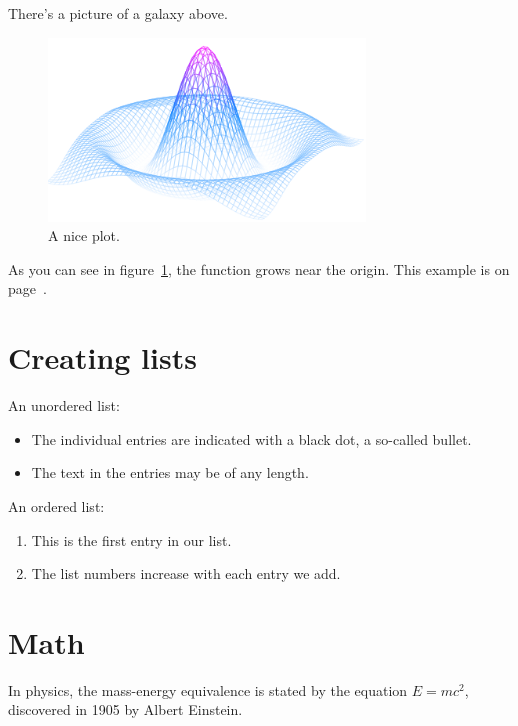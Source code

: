 \documentclass[12pt, letterpaper]{article}
\begin{document}
    There's a picture of a galaxy above.

    \begin{figure}[h]
        \centering
        \includegraphics[width=0.75\textwidth]{mesh}
        \caption{A nice plot.}
        \label{fig:mesh1}
    \end{figure}

    As you can see in figure~\ref{fig:mesh1}, the function grows near the origin.
    This example is on page~\pageref{fig:mesh1}.


    \section{Creating lists}\label{sec:creating-lists}

    An unordered list:

    \begin{itemize}
        \item The individual entries are indicated with a black dot, a so-called bullet.
        \item The text in the entries may be of any length.
    \end{itemize}

    \noindent An ordered list:

    \begin{enumerate}
        \item This is the first entry in our list.
        \item The list numbers increase with each entry we add.
    \end{enumerate}


    \section{Math}\label{sec:math}

    In physics, the mass-energy equivalence is stated by the equation $E=mc^2$, discovered in 1905 by Albert Einstein.
\end{document}
